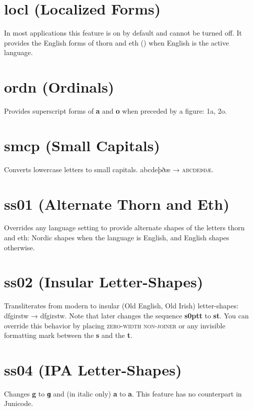 \documentclass[12pt,letterpaper,openany]{book}
\begin{document}
\section{locl (Localized Forms)}
In most applications this feature is on by default and cannot be turned off.
It provides the English forms of thorn and eth
(\textbf{}) when English is the
active language.

\section{ordn (Ordinals)}
Provides superscript forms of \textbf{a} and \textbf{o} when preceded by a figure:
{ 1a, 2o}.

\section{smcp (Small Capitals)}
Converts lowercase letters to small capitals. abcdeþðæ → \textsc{abcdeþðæ}.

\section{ss01 (Alternate Thorn and Eth)}
Overrides any language setting to provide alternate shapes of the letters thorn and eth: Nordic shapes when the language is English, and English shapes otherwise.

\section{ss02 (Insular Letter-Shapes)}
Transliterates from modern to insular (Old English, Old Irish) letter-shapes:\linebreak
dfgirstw → { dfgirstw}. Note that  later
changes the sequence \textbf{ s\kern0ptt}
to \textbf{ st}. You can override this behavior by placing
 \textsc{zero-width non-joiner} or any invisible formatting mark
between the \textbf{s} and the \textbf{t}.

\section{ss04 (IPA Letter-Shapes)}
Changes \textbf{g} to \textbf{ɡ} and (in italic only)
\textbf{a} to \textbf{ a}. This feature has no counterpart in
Junicode.
\end{document}
